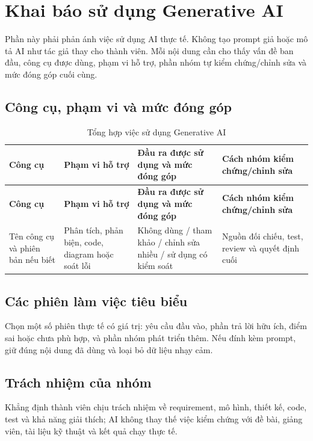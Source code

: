 \section{Khai báo sử dụng Generative AI}

Phần này phải phản ánh việc sử dụng AI thực tế. Không tạo prompt giả hoặc mô tả AI như tác giả thay cho thành viên. Mỗi nội dung cần cho thấy vấn đề ban đầu, công cụ được dùng, phạm vi hỗ trợ, phần nhóm tự kiểm chứng/chỉnh sửa và mức đóng góp cuối cùng.

\subsection{Công cụ, phạm vi và mức đóng góp}

\begin{longtable}{|L{25mm}|L{33mm}|L{40mm}|L{38mm}|}
  \caption{Tổng hợp việc sử dụng Generative AI}\\
  \hline
  \textbf{Công cụ} & \textbf{Phạm vi hỗ trợ} & \textbf{Đầu ra được sử dụng và mức đóng góp} & \textbf{Cách nhóm kiểm chứng/chỉnh sửa}\\\hline
  \endfirsthead
  \hline
  \textbf{Công cụ} & \textbf{Phạm vi hỗ trợ} & \textbf{Đầu ra được sử dụng và mức đóng góp} & \textbf{Cách nhóm kiểm chứng/chỉnh sửa}\\\hline
  \endhead
  Tên công cụ và phiên bản nếu biết & Phân tích, phản biện, code, diagram hoặc soát lỗi & Không dùng / tham khảo / chỉnh sửa nhiều / sử dụng có kiểm soát & Nguồn đối chiếu, test, review và quyết định cuối\\\hline
\end{longtable}

\subsection{Các phiên làm việc tiêu biểu}

Chọn một số phiên thực tế có giá trị: yêu cầu đầu vào, phần trả lời hữu ích, điểm sai hoặc chưa phù hợp, và phần nhóm phát triển thêm. Nếu đính kèm prompt, giữ đúng nội dung đã dùng và loại bỏ dữ liệu nhạy cảm.

\subsection{Trách nhiệm của nhóm}

Khẳng định thành viên chịu trách nhiệm về requirement, mô hình, thiết kế, code, test và khả năng giải thích; AI không thay thế việc kiểm chứng với đề bài, giảng viên, tài liệu kỹ thuật và kết quả chạy thực tế.
